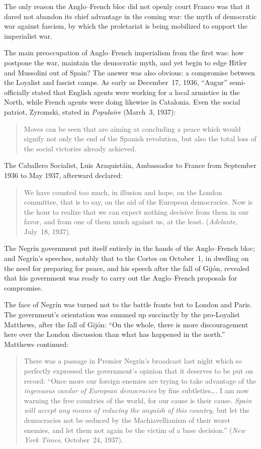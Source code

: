 The only reason the Anglo--French bloc did not openly court Franco was that it dared not abandon its chief advantage in the coming war: the myth of democratic war against fascism, by which the proletariat is being mobilized to support the imperialist war.

The main preoccupation of Anglo--French imperialism from the first was: how postpone the war\kn, maintain the democratic myth, and yet begin to edge Hitler and Mussolini out of Spain? The answer was also obvious: a compromise between the Loyalist and fascist camps. As early as December~17, 1936, ``Augur'' semi-officially stated that English agents were working for a local armistice in the North, while French agents were doing likewise in Catalonia. Even the social patriot, Zyromski, stated in \emph{Populaire} (March~3, 1937):

\begin{quotation}
  Moves can be seen that are aiming at concluding a peace which would signify not only the end of the Spanish revolution, but also the total loss of the social victories already achieved.  
\end{quotation}

The Caballero Socialist, Luis Araquist\'ain, Ambassador to France from September 1936 to May 1937, afterward declared:

\begin{quotation}
  We have counted too much, in illusion and hope, on the London committee, that is to say, on the aid of the European democracies. Now is the hour to realize that we can expect nothing decisive from them in our favor, and from one of them much against us, at the least. (\emph{Adelante,} July~18, 1937).
\end{quotation}

The Negr\'in government put itself entirely in the hands of the Anglo--French bloc; and Negr\'in’s speeches, notably that to the Cortes on October~1, in dwelling on the need for preparing for peace, and his speech after the fall of Gij\'on, revealed that his government was ready to carry out the Anglo--French proposals for compromise.

The face of Negr\'in was turned not to the battle fronts but to London and Paris. The government’s orientation was summed up succinctly by the pro-Loyalist Matthews, after the fall of Gij\'on: ``On the whole, there is more discouragement here over the London discussion than what has happened in the north.'' Matthews continued:

\begin{quotation}
  There was a passage in Premier Negr\'in’s broadcast last ni\-ght which so perfectly expressed the government’s opinion that it deserves to be put on record: ``Once more our foreign enemies are trying to take advantage of the \emph{ingenuous candor of European democracies} by fine subtleties\dots. I am now warning the free countries of the world, for our cause is their cause. \emph{Spain will accept any means of reducing the anguish of this country,} but let the democracies not be seduced by the Machiavellianism of their worst enemies, and let them not again be the victim of a base decision.\kn\kn'' (\emph{New York Times,} October~24, 1937).
\end{quotation}

